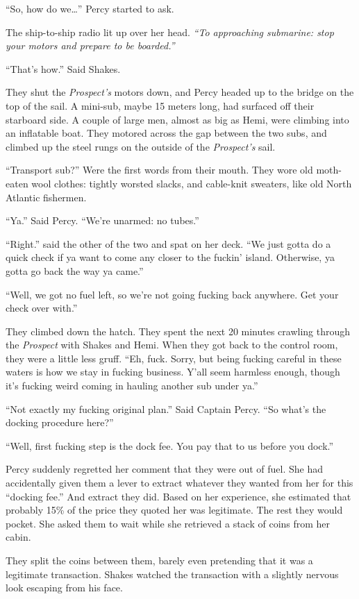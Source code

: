 \documentclass[]{scrbook}
\begin{document}
``So, how do we\ldots{}'' Percy started to ask.

The ship-to-ship radio lit up over her head. \emph{``To approaching
submarine: stop your motors and prepare to be boarded.''}

``That's how.'' Said Shakes.

They shut the \emph{Prospect's} motors down, and Percy headed up to the
bridge on the top of the sail. A mini-sub, maybe 15 meters long, had
surfaced off their starboard side. A couple of large men, almost as big
as Hemi, were climbing into an inflatable boat. They motored across the
gap between the two subs, and climbed up the steel rungs on the outside
of the \emph{Prospect's} sail.

``Transport sub?'' Were the first words from their mouth. They wore old
moth-eaten wool clothes: tightly worsted slacks, and cable-knit
sweaters, like old North Atlantic fishermen.

``Ya.'' Said Percy. ``We're unarmed: no tubes.''

``Right.'' said the other of the two and spat on her deck. ``We just
gotta do a quick check if ya want to come any closer to the fuckin'
island. Otherwise, ya gotta go back the way ya came.''

``Well, we got no fuel left, so we're not going fucking back anywhere.
Get your check over with.''

They climbed down the hatch. They spent the next 20 minutes crawling
through the \emph{Prospect} with Shakes and Hemi. When they got back to
the control room, they were a little less gruff. ``Eh, fuck. Sorry, but
being fucking careful in these waters is how we stay in fucking
business. Y'all seem harmless enough, though it's fucking weird coming
in hauling another sub under ya.''

``Not exactly my fucking original plan.'' Said Captain Percy. ``So
what's the docking procedure here?''

``Well, first fucking step is the dock fee. You pay that to us before
you dock.''

Percy suddenly regretted her comment that they were out of fuel. She had
accidentally given them a lever to extract whatever they wanted from her
for this ``docking fee.'' And extract they did. Based on her experience,
she estimated that probably 15\% of the price they quoted her was
legitimate. The rest they would pocket. She asked them to wait while she
retrieved a stack of coins from her cabin.

They split the coins between them, barely even pretending that it was a
legitimate transaction. Shakes watched the transaction with a slightly
nervous look escaping from his face.
\end{document}

